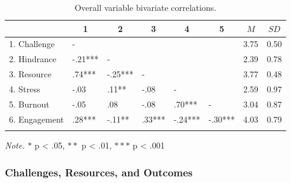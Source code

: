 \documentclass[
  man]{apa7}
\begin{document}
\begin{table}[tbp]

\begin{center}
\begin{threeparttable}

\caption{\label{tab:unnamed-chunk-1}Overall variable bivariate correlations.}

\begin{tabular}{llllllll}
\toprule
 & \multicolumn{1}{c}{1} & \multicolumn{1}{c}{2} & \multicolumn{1}{c}{3} & \multicolumn{1}{c}{4} & \multicolumn{1}{c}{5} & \multicolumn{1}{c}{$M$} & \multicolumn{1}{c}{$SD$}\\
\midrule
1. Challenge & - &  &  &  &  & 3.75 & 0.50\\
2. Hindrance & -.21*** & - &  &  &  & 2.39 & 0.78\\
3. Resource & .74*** & -.25*** & - &  &  & 3.77 & 0.48\\
4. Stress & -.03 & .11** & -.08 & - &  & 2.59 & 0.97\\
5. Burnout & -.05 & .08 & -.08 & .70*** & - & 3.04 & 0.87\\
6. Engagement & .28*** & -.11** & .33*** & -.24*** & -.30*** & 4.03 & 0.79\\
\bottomrule
\addlinespace
\end{tabular}

\begin{tablenotes}[para]
\normalsize{\textit{Note.} $*$ p < .05, $**$ p < .01, $***$ p < .001}
\end{tablenotes}

\end{threeparttable}
\end{center}

\end{table}

\hypertarget{challenges-resources-and-outcomes}{%
\subsubsection{Challenges, Resources, and Outcomes}\label{challenges-resources-and-outcomes}}
\end{document}
